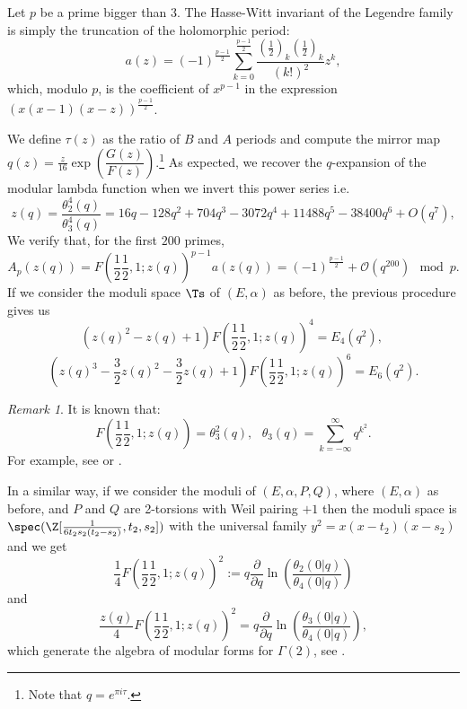 \documentclass[11pt,leqno]{article}
\theoremstyle{remark}
\newtheorem{rem}{Remark}
\theoremstyle{definition}
\begin{document}
Let $p$ be a prime bigger than $3$. The Hasse-Witt invariant of the Legendre family is simply the truncation of the holomorphic period: 
\[
a(z) = (-1)^{\frac{p-1}{2}}
\sum_{k=0}^\frac{p-1}{2} \frac{(\frac{1}{2})_k (\frac{1}{2})_k}{(k!)^2} z^k,
\]
which, modulo $p$, is the coefficient of $x^{p-1}$ in the expression $(x(x-1)(x-z))^{\frac{p-1}{2}}$. 

We define $\tau(z)$ as the ratio of $B$ and $A$ periods and compute the mirror map $q(z)=\frac{z}{16}\exp\left(\dfrac{G(z)}{F(z)} \right)
$.\footnote{Note that $q=e^{\pi i \tau}$.} As expected, we recover the $q$-expansion of the modular lambda function when we invert this power series i.e.
\begin{equation*}
    z(q)=\frac{\theta^4_2(q)}{\theta^4_3(q)}=16 q-128 q^2+704 q^3-3072 q^4+11488 q^5-38400
   q^6+O\left(q^7\right),
\end{equation*}
We verify that, for the first $200$ primes,
$$
A_p(z(q)) = F\left(\frac{1}{2} \frac{1}{2},1; z(q)\right)^{p-1}a(z(q))=(-1)^{\frac{p-1}{2}} + \mathcal{O}(q^{200})  \mod p.
$$
If we consider the moduli space $\Ts$ of $(E,\alpha)$ as before, the previous procedure gives us 
$$
\left(z(q)^2-z(q)+1\right) F\left(\frac{1}{2} \frac{1}{2},1; z(q)\right)^4=E_4(q^2),\ 
$$
$$
\left(z(q)^3-\frac{3}{2}z(q)^2-\frac{3}{2}z(q)+1\right)F\left(\frac{1}{2} \frac{1}{2},1; z(q)\right)^6=E_6(q^2).
$$
\begin{rem}
It is known that:
$$
F\left(\frac{1}{2} \frac{1}{2},1; z(q)\right) = \theta_3^2(q), \ \ \ \theta_3(q) = \sum^{\infty}_{k=-\infty} q^{k^2}.
$$
For example, see \cite[(4.32)]{Wenzhe2021} or \cite[Theorem 8.3]{Chan2020}.
\end{rem}
In a similar way, if we consider the moduli of $(E,\alpha,P,Q)$, where $(E,\alpha)$ as before, and $P$ and $Q$ are 2-torsions with Weil pairing $+1$ then the moduli space is $\spec(\Z[\frac{1}{6t_2s_2(t_2-s_2)},t_2,s_2])$ with the universal family $y^2=x(x-t_2)(x-s_2)$ and we get 
$$
\frac{1}{4}F\left(\frac{1}{2} \frac{1}{2},1; z(q)\right)^2:=q\frac{\partial}{\partial q}\ln(\frac{\theta_2(0|q)}{\theta_4(0|q)})
$$
and
$$
\frac{z(q)}{4}F\left(\frac{1}{2} \frac{1}{2},1; z(q)\right)^2=q\frac{\partial}{\partial q}\ln(\frac{\theta_3(0|q)}{\theta_4(0|q)}),
$$
which generate the algebra of  modular forms  for $\Gamma(2)$, see \cite[Page 334]{ho14}. 
\end{document}
